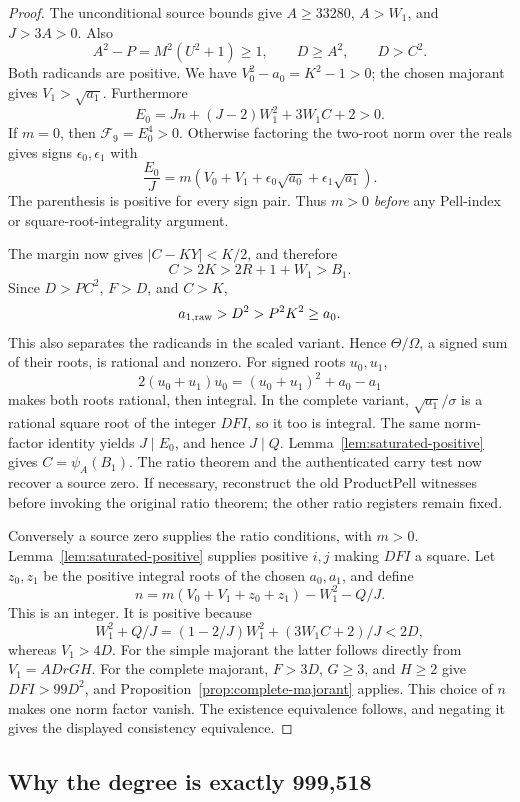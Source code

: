 \begin{proof}
The unconditional source bounds give \(A\ge33280\), \(A>W_1\), and
\(J>3A>0\). Also
\[
 A^2-P=M^2(U^2+1)\ge1,\qquad
 D\ge A^2,\qquad D>C^2.
\]
Both radicands are positive. We have \(V_0^2-a_0=K^2-1>0\);
the chosen majorant gives \(V_1>\sqrt{a_1}\). Furthermore
\[
 E_0=Jn+(J-2)W_1^2+3W_1C+2>0.
\]
If \(m=0\), then \(\mathcal F_9=E_0^4>0\). Otherwise factoring the
two-root norm over the reals gives signs \(\epsilon_0,\epsilon_1\) with
\[
 \frac{E_0}{J}
 =m\left(V_0+V_1+\epsilon_0\sqrt{a_0}
                    +\epsilon_1\sqrt{a_1}\right).
\]
The parenthesis is positive for every sign pair. Thus \(m>0\)
\emph{before} any Pell-index or square-root-integrality argument.

The margin now gives \(|C-KY|<K/2\), and therefore
\[
 C>2K>2R+1+W_1>B_1.
\]
Since \(D>PC^2\), \(F>D\), and \(C>K\),
\[
 a_{1,\rm raw}>D^2>P^2K^2\ge a_0.
\]
This also separates the radicands in the scaled variant. Hence
\(\Theta/\Omega\), a signed sum of their roots, is rational and nonzero.
For signed roots \(u_0,u_1\),
\[
 2(u_0+u_1)u_0=(u_0+u_1)^2+a_0-a_1
\]
makes both roots rational, then integral. In the complete variant,
\(\sqrt{a_1}/\sigma\) is a rational square root of the integer
\(DFI\), so it too is integral. The same norm-factor identity yields
\(J\mid E_0\), and hence \(J\mid Q\).
Lemma~\ref{lem:saturated-positive} gives \(C=\psi_A(B_1)\).
The ratio theorem and the authenticated carry test now recover a source
zero. If necessary, reconstruct the old ProductPell witnesses before
invoking the original ratio theorem; the other ratio registers remain
fixed.

Conversely a source zero supplies the ratio conditions, with \(m>0\).
Lemma~\ref{lem:saturated-positive} supplies positive \(i,j\) making \(DFI\)
a square. Let \(z_0,z_1\) be the positive integral roots of the chosen
\(a_0,a_1\), and define
\[
 n=m(V_0+V_1+z_0+z_1)-W_1^2-Q/J.
\]
This is an integer. It is positive because
\[
 W_1^2+Q/J
 =(1-2/J)W_1^2+(3W_1C+2)/J<2D,
\]
whereas \(V_1>4D\). For the simple majorant the latter follows directly
from \(V_1=ADrGH\). For the complete majorant,
\(F>3D\), \(G\ge3\), and \(H\ge2\) give \(DFI>99D^2\), and
Proposition~\ref{prop:complete-majorant} applies. This choice of \(n\)
makes one norm factor vanish. The existence equivalence follows, and
negating it gives the displayed consistency equivalence.
\end{proof}

\subsection{Why the degree is exactly 999,518}

